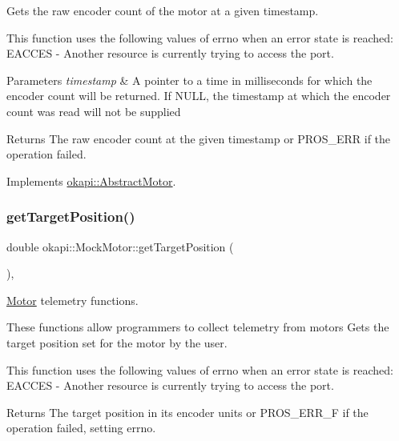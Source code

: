 Gets the raw encoder count of the motor at a given timestamp. 

This function uses the following values of errno when an error state is reached\+: E\+A\+C\+C\+ES -\/ Another resource is currently trying to access the port.


\begin{DoxyParams}{Parameters}
{\em timestamp} & A pointer to a time in milliseconds for which the encoder count will be returned. If N\+U\+LL, the timestamp at which the encoder count was read will not be supplied\\
\hline
\end{DoxyParams}
\begin{DoxyReturn}{Returns}
The raw encoder count at the given timestamp or P\+R\+O\+S\+\_\+\+E\+RR if the operation failed. 
\end{DoxyReturn}


Implements \mbox{\hyperlink{classokapi_1_1AbstractMotor_aa34fefa954fbff26e3d68e59c4f10964}{okapi\+::\+Abstract\+Motor}}.

\mbox{\label{classokapi_1_1MockMotor_a0c9129fba90c380db171c072ada1b9d7}} 
\subsubsection{\texorpdfstring{getTargetPosition()}{getTargetPosition()}}
{\footnotesize\ttfamily double okapi\+::\+Mock\+Motor\+::get\+Target\+Position (\begin{DoxyParamCaption}{ }\end{DoxyParamCaption})\hspace{0.3cm}{\ttfamily [override]}, {\ttfamily [virtual]}}



\mbox{\hyperlink{classokapi_1_1Motor}{Motor}} telemetry functions. 

These functions allow programmers to collect telemetry from motors Gets the target position set for the motor by the user.

This function uses the following values of errno when an error state is reached\+: E\+A\+C\+C\+ES -\/ Another resource is currently trying to access the port.

\begin{DoxyReturn}{Returns}
The target position in its encoder units or P\+R\+O\+S\+\_\+\+E\+R\+R\+\_\+F if the operation failed, setting errno. 
\end{DoxyReturn}



